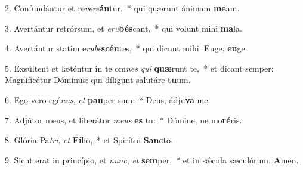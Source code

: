 2. Confundántur et re\textit{ve}\textit{re}\textbf{án}tur,~*  qui quærunt ánimam \textbf{me}am.\

3. Avertántur retrórsum, et \textit{e}\textit{ru}\textbf{bés}cant,~*  qui volunt mihi \textbf{ma}la.\

4. Avertántur statim e\textit{ru}\textit{be}\textbf{scén}tes,~*  qui dicunt mihi: Euge, \textbf{eu}ge.\

5. Exsúltent et læténtur in te om\textit{nes} \textit{qui} \textbf{quæ}runt te,~*  et dicant semper: Magnificétur Dóminus: qui díligunt salutáre \textbf{tu}um.\

6. Ego vero egé\textit{nus}, \textit{et} \textbf{pau}per sum:~*  Deus, ádju\textbf{va} me.\

7. Adjútor meus, et liberátor \textit{me}\textit{us} \textbf{es} tu:~*  Dómine, ne mo\textbf{ré}ris.\

8. Glória Pa\textit{tri}, \textit{et} \textbf{Fí}lio,~*  et Spirítui \textbf{Sanc}to.\

9. Sicut erat in princípio, et \textit{nunc}, \textit{et} \textbf{sem}per,~*  et in sǽcula sæculórum. \textbf{A}men.\

